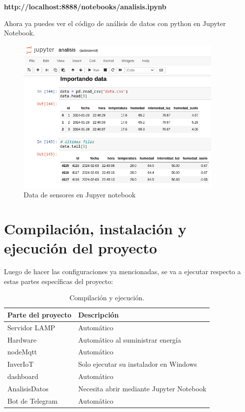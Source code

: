 \textbf{http://localhost:8888/notebooks/analisis.ipynb}

Ahora ya puedes ver el código de análisis de datos con python en Jupyter Notebook.

\begin{figure}[h]
\centering
\includegraphics[width=0.9\textwidth]{img/desarrollo/jupyter_inicio.png}
\caption{Data de sensores en Jupyer notebook}
\end{figure}

\section{Compilación, instalación y ejecución del proyecto}
Luego de hacer las configuraciones ya mencionadas, se va a ejecutar respecto a estas partes específicas del proyecto:

\begin{table}[htbp]
\begin{center}
\caption{Compilación y ejecución.}
\begin{tabular}{|l|l|}
\hline
\rowcolor[HTML]{C0C0C0} 
\textbf{Parte del proyecto} & \textbf{Descripción}\\ \hline
Servidor LAMP & Automático\\ \hline
Hardware &  Automático al suministrar energía\\ \hline
nodeMqtt & Automático \\ \hline
InverIoT &  Solo ejecutar su instalador en Windows\\ \hline
dashboard &  Automático \\ \hline
AnalisisDatos & Necesita abrir mediante Jupyter Notebook \\ \hline
Bot de Telegram & Automático \\ \hline
\end{tabular}
\label{tabla:CompilacionEjecucion}
\end{center}
\end{table}

